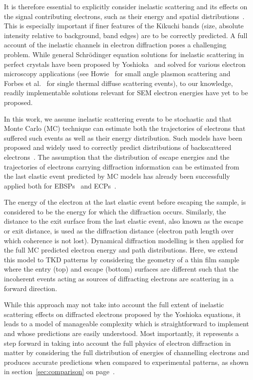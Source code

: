 It is therefore essential to explicitly consider inelastic scattering and its effects on the signal contributing electrons, such as their energy and spatial distributions~\cite{degraef2013e, winkelmann2016}. This is especially important if finer features of the Kikuchi bands (size, absolute intensity relative to background, band edges) are to be correctly predicted. A full account of the inelastic channels in electron diffraction poses a challenging problem. While general Schr\"odinger equation solutions for inelastic scattering in perfect crystals have been proposed by Yoshioka~\cite{yoshioka1957a} and solved for various electron microscopy applications (see Howie~\cite{howie1963} for small angle plasmon scattering and Forbes et al.~\cite{forbes2011} for single thermal diffuse scattering events), to our knowledge, readily implementable solutions relevant for SEM electron energies have yet to be proposed.

In this work, we assume inelastic scattering events to be stochastic and that Monte Carlo (MC) technique can estimate both the trajectories of electrons that suffered such events as well as their energy distribution. Such models have been proposed and widely used to correctly predict distributions of backscattered electrons~\cite{joy1995a}. The assumption that the distribution of escape energies and the trajectories of electrons carrying diffraction information can be estimated from the last elastic event predicted by MC models has already been successfully applied both for EBSPs~\cite{degraef2013e} and ECPs~\cite{degraef2017k}. 

The energy of the electron at the last elastic event before escaping the sample, is considered to be the energy for which the diffraction occurs. Similarly, the distance to the exit surface from the last elastic event, also known as the escape or exit distance, is used as the diffraction distance (electron path length over which coherence is not lost). Dynamical diffraction modelling is then applied for the full MC predicted electron energy and path distributions. Here, we extend this model to TKD patterns by considering the geometry of a thin film sample where the entry (top) and escape (bottom) surfaces are different such that the incoherent events acting as sources of diffracting electrons are scattering in a forward direction. 

While this approach may not take into account the full extent of inelastic scattering effects on diffracted electrons proposed by the Yoshioka equations, it leads to a model of manageable complexity which is straightforward to implement and whose predictions are easily understood. Most importantly, it represents a step forward in taking into account the full physics of electron diffraction in matter by considering the full distribution of energies of channelling electrons and produces accurate predictions when compared to experimental patterns, as shown in section~\ref{sec:comparison} on page~\pageref{sec:comparison}.


